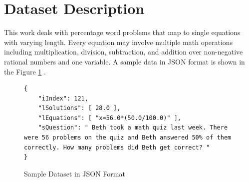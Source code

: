 \documentclass[document.tex]{subfiles}
\begin{document}

\section{Dataset Description}
This work deals with percentage word problems that map to single equations with varying length. Every equation may involve multiple math operations including multiplication, division, subtraction, and addition over non-negative rational numbers and one variable. A sample data in JSON format is shown in the Figure \ref{fig:data} .
\begin{figure}[H]
	\begin{center}
		\begin{lstlisting}
{
	"iIndex": 121,
	"lSolutions": [ 28.0 ],
	"lEquations": [ "x=56.0*(50.0/100.0)" ],
	"sQuestion": " Beth took a math quiz last week. There were 56 problems on the quiz and Beth answered 50% of them correctly. How many problems did Beth get correct? "
}
		\end{lstlisting}
	\end{center}
	\caption{Sample Dataset in JSON Format}
	\label{fig:data}
\end{figure}
\end{document}
